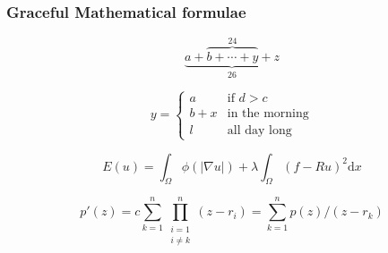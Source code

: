 \documentclass[notheorems,serif,table,compress]{beamer}  %
\begin{document}
%
\begin{frame}
\frametitle{Graceful Mathematical formulae}
\begin{tcolorbox}[colback=blue!5,colframe=blue!75!black] 
\newcommand{\ud}{\mathrm{d}}
\begin{displaymath}
\underbrace{a + \overbrace{b + \cdots + y}^{24} + z}_{26}
\end{displaymath}

\begin{displaymath}
y = \left\{ \begin{array}{ll}
 a & \textrm{if $d>c$}\\
 b+x & \textrm{in the morning}\\
 l & \textrm{all day long}
  \end{array} \right.
\end{displaymath}

\begin{displaymath}
E(u)=\int_{\Omega}\phi(|\nabla u|)+\lambda \int_{\Omega}(f-Ru)^2\ud x
\end{displaymath}  

\begin{displaymath}
p'(z)=c\sum_{k=1}^n \prod_{\substack{i=1 \\ i\neq k}}^n(z-r_i)=\sum_{k=1}^n p(z)/(z-r_k)
\end{displaymath} 
\end{tcolorbox}  

\end{frame}
\end{document}
